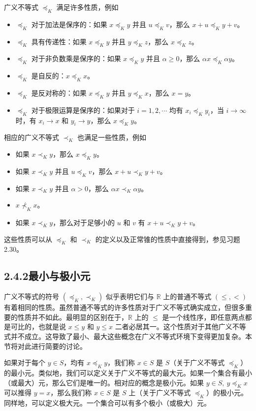 \documentclass[UTF8, 12pt, fontset=fandol, oneside]{ctexart}
\begin{document}
广义不等式 $\preceq_K$ 满足许多性质，例如
\begin{itemize}
  \item $\preceq_K$ 对于加法是保序的：如果 $x\preceq_K y$ 并且 $u\preceq_K v$，那么 $x+u\preceq_K y+v$。
  \item $\preceq_K$ 具有传递性：如果 $x\preceq_K y$ 并且 $y\preceq_K z$，那么 $x\preceq_K z$。
  \item $\preceq_K$ 对于非负数乘是保序的：如果 $x\preceq_K y$ 并且 $\alpha\ge 0$，那么 $\alpha x\preceq_K\alpha y$。
  \item $\preceq_K$ 是自反的：$x\preceq_K x$。
  \item $\preceq_K$ 是反对称的：如果 $x\preceq_K y$ 并且 $y\preceq_K x$，那么 $x=y$。
  \item $\preceq_K$ 对于极限运算是保序的：如果对于 $i=1,2,\cdots$ 均有 $x_i\preceq_K y_i$，当 $i\to\infty$ 时，有 $x_i\to x$ 和 $y_i\to y$，那么 $x\preceq_K y$。
\end{itemize}
相应的广义不等式 $\prec_K$ 也满足一些性质，例如
\begin{itemize}
  \item 如果 $x\prec_K y$，那么 $x\preceq_K y$。
  \item 如果 $x\prec_K y$ 并且 $u\preceq_K v$，那么 $x+u\prec_K y+v$。
  \item 如果 $x\prec_K y$ 并且 $\alpha>0$，那么 $\alpha x\prec_K\alpha y$。
  \item $x\not\prec_K x$。
  \item 如果 $x\prec_K y$，那么对于足够小的 $u$ 和 $v$ 有 $x+u\prec_K y+v$。
\end{itemize}
这些性质可以从 $\preceq_K$ 和 $\prec_K$ 的定义以及正常锥的性质中直接得到，参见习题 2.30。

\subsection*{2.4.2\quad 最小与极小元}

广义不等式的符号 $(\preceq_K,\prec_K)$ 似乎表明它们与 $\mathbb{R}$ 上的普通不等式 $(\le,<)$ 有着相同的性质。虽然普通不等式的许多性质对于广义不等式确实成立，但很多重要的性质并不如此。最明显的区别在于，$\mathbb{R}$ 上的 $\le$ 是一个线性序，即任意两点都是可比的，也就是说 $x\le y$ 和 $y\le x$ 二者必居其一。这个性质对于其他广义不等式并不成立。这导致了最小、最大这些概念在广义不等式环境下变得更加复杂。本节将对此进行简要的讨论。

如果对于每个 $y\in S$，均有 $x\preceq_K y$，我们称 $x\in S$ 是 $S$（关于广义不等式 $\preceq_K$）的最小元。类似地，我们可以定义关于广义不等式的最大元。如果一个集合有最小（或最大）元，那么它们是唯一的。相对应的概念是极小元。如果 $y\in S,\ y\preceq_K x$ 可以推得 $y=x$，那么我们称 $x\in S$ 是 $S$ 上（关于广义不等式 $\preceq_K$）的极小元。同样地，可以定义极大元。一个集合可以有多个极小（或极大）元。
\end{document}

